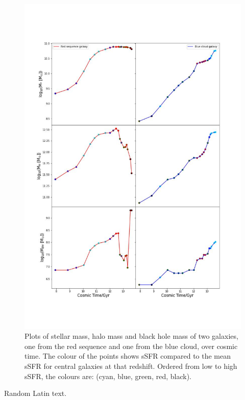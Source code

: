 \documentclass[12pt, onecolumn]{revtex4}    %
\begin{document}
\begin{figure}[H]
\centering
\includegraphics[width=14cm]{Plot_2.jpeg}
\caption{Plots of stellar mass, halo mass and black hole mass of two galaxies, one from the red sequence and one from the blue cloud, over cosmic time. The colour of the points shows sSFR compared to the mean sSFR for central galaxies at that redshift. Ordered from low to high sSFR, the colours are: (cyan, blue, green, red, black).}
\label{fig:2}
\end{figure}

\newpage

Random Latin text.
\end{document}
